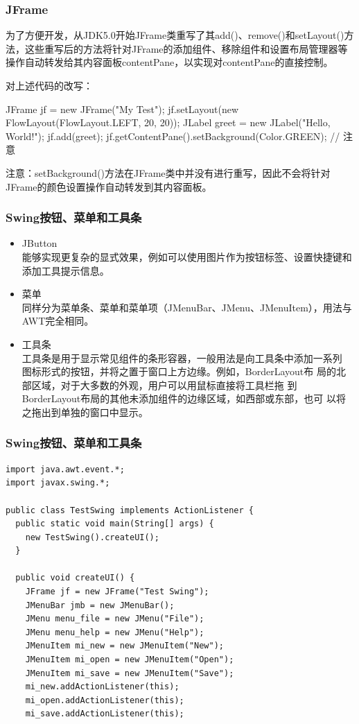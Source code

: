 \begin{frame}[fragile] %
  \frametitle{JFrame}

  为了方便开发，从JDK5.0开始JFrame类重写了其add()、remove()和setLayout()方法，这些重写后的方法{\hei 将针对JFrame的添加组件、移除组件和设置布局管理器等操作自动转发给其内容面板contentPane，以实现对contentPane的直接控制}。

  对上述代码的改写：

  \begin{javaCode}
    JFrame jf = new JFrame("My Test");
    jf.setLayout(new FlowLayout(FlowLayout.LEFT, 20, 20));
    JLabel greet = new JLabel("Hello, World!");
    jf.add(greet);
    jf.getContentPane().setBackground(Color.GREEN); // 注意
  \end{javaCode}

  {\Red\kai 注意：setBackground()方法在JFrame类中并没有进行重写，因此不会将针对JFrame的颜色设置操作自动转发到其内容面板。}
\end{frame}

\begin{frame}[fragile] %
  \frametitle{Swing按钮、菜单和工具条}

  \begin{itemize}
  \item JButton\\
    能够实现更复杂的显式效果，例如可以使用图片作为按钮标签、设置快捷键和添加工具提示信息。
  \item 菜单\\
    同样分为菜单条、菜单和菜单项（JMenuBar、JMenu、JMenuItem），用法与AWT完全相同。
  \item 工具条\\
    工具条是用于显示常见组件的条形容器，一般用法是向工具条中添加一系列
    图标形式的按钮，并将之置于窗口上方边缘。{\kai 例如，BorderLayout布
      局的北部区域，对于大多数的外观，用户可以用鼠标直接将工具栏拖
      到BorderLayout布局的其他未添加组件的边缘区域，如西部或东部，也可
      以将之拖出到单独的窗口中显示。}
  \end{itemize}
\end{frame}

\begin{frame}[fragile] %
  \frametitle{Swing按钮、菜单和工具条}


  \scriptsize
\begin{verbatim}
import java.awt.event.*;
import javax.swing.*;

public class TestSwing implements ActionListener {
  public static void main(String[] args) {
    new TestSwing().createUI();
  }

  public void createUI() {
    JFrame jf = new JFrame("Test Swing");
    JMenuBar jmb = new JMenuBar();
    JMenu menu_file = new JMenu("File");
    JMenu menu_help = new JMenu("Help");
    JMenuItem mi_new = new JMenuItem("New");
    JMenuItem mi_open = new JMenuItem("Open");
    JMenuItem mi_save = new JMenuItem("Save");
    mi_new.addActionListener(this);
    mi_open.addActionListener(this);
    mi_save.addActionListener(this);
\end{verbatim}
\end{frame}

